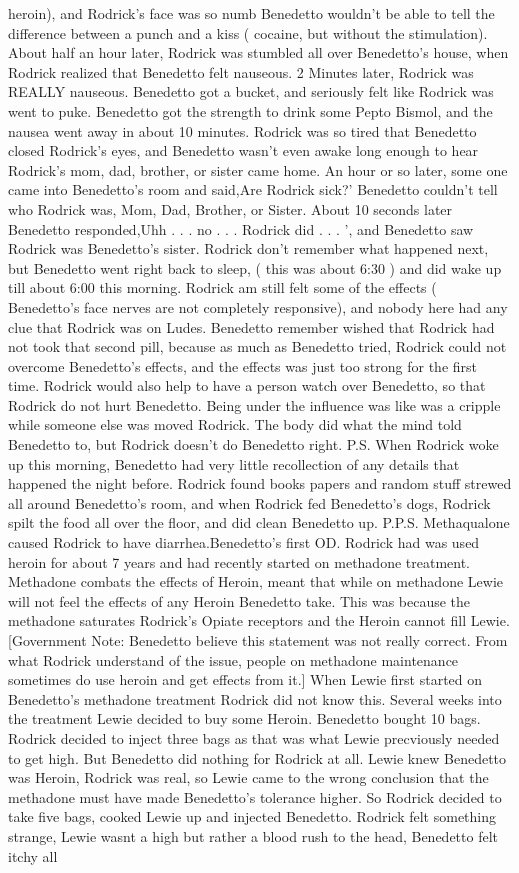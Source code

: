 \documentclass[12pt]{book}
\begin{document}
heroin), and Rodrick's face was so numb Benedetto wouldn't be able to tell the difference between a punch and a kiss ( cocaine, but without the stimulation). About half an hour later, Rodrick was stumbled all over Benedetto's house, when Rodrick realized that Benedetto felt nauseous. 2 Minutes later, Rodrick was REALLY nauseous. Benedetto got a bucket, and seriously felt like Rodrick was went to puke. Benedetto got the strength to drink some Pepto Bismol, and the nausea went away in about 10 minutes. Rodrick was so tired that Benedetto closed Rodrick's eyes, and Benedetto wasn't even awake long enough to hear Rodrick's mom, dad, brother, or sister came home. An hour or so later, some one came into Benedetto's room and said,Are Rodrick sick?' Benedetto couldn't tell who Rodrick was, Mom, Dad, Brother, or Sister. About 10 seconds later Benedetto responded,Uhh . . .  no . . .  Rodrick did . . .  ', and Benedetto saw Rodrick was Benedetto's sister. Rodrick don't remember what happened next, but Benedetto went right back to sleep, ( this was about 6:30 ) and did wake up till about 6:00 this morning. Rodrick am still felt some of the effects ( Benedetto's face nerves are not completely responsive), and nobody here had any clue that Rodrick was on Ludes. Benedetto remember wished that Rodrick had not took that second pill, because as much as Benedetto tried, Rodrick could not overcome Benedetto's effects, and the effects was just too strong for the first time. Rodrick would also help to have a person watch over Benedetto, so that Rodrick do not hurt Benedetto. Being under the influence was like was a cripple while someone else was moved Rodrick. The body did what the mind told Benedetto to, but Rodrick doesn't do Benedetto right. P.S. When Rodrick woke up this morning, Benedetto had very little recollection of any details that happened the night before. Rodrick found books papers and random stuff strewed all around Benedetto's room, and when Rodrick fed Benedetto's dogs, Rodrick spilt the food all over the floor, and did clean Benedetto up. P.P.S. Methaqualone caused Rodrick to have diarrhea.Benedetto's first OD. Rodrick had was used heroin for about 7 years and had recently started on methadone treatment. Methadone combats the effects of Heroin, meant that while on methadone Lewie will not feel the effects of any Heroin Benedetto take. This was because the methadone saturates Rodrick's Opiate receptors and the Heroin cannot fill Lewie. [Government Note: Benedetto believe this statement was not really correct. From what Rodrick understand of the issue, people on methadone maintenance sometimes do use heroin and get effects from it.] When Lewie first started on Benedetto's methadone treatment Rodrick did not know this. Several weeks into the treatment Lewie decided to buy some Heroin. Benedetto bought 10 bags. Rodrick decided to inject three bags as that was what Lewie precviously needed to get high. But Benedetto did nothing for Rodrick at all. Lewie knew Benedetto was Heroin, Rodrick was real, so Lewie came to the wrong conclusion that the methadone must have made Benedetto's tolerance higher. So Rodrick decided to take five bags, cooked Lewie up and injected Benedetto. Rodrick felt something strange, Lewie wasnt a high but rather a blood rush to the head, Benedetto felt itchy all 
\end{document}
